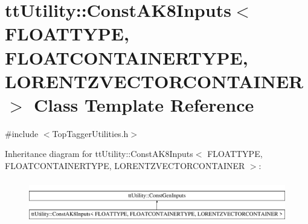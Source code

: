 \hypertarget{classttUtility_1_1ConstAK8Inputs}{\section{tt\-Utility\-:\-:Const\-A\-K8\-Inputs$<$ F\-L\-O\-A\-T\-T\-Y\-P\-E, F\-L\-O\-A\-T\-C\-O\-N\-T\-A\-I\-N\-E\-R\-T\-Y\-P\-E, L\-O\-R\-E\-N\-T\-Z\-V\-E\-C\-T\-O\-R\-C\-O\-N\-T\-A\-I\-N\-E\-R $>$ Class Template Reference}
\label{classttUtility_1_1ConstAK8Inputs}
}


{\ttfamily \#include $<$Top\-Tagger\-Utilities.\-h$>$}

Inheritance diagram for tt\-Utility\-:\-:Const\-A\-K8\-Inputs$<$ F\-L\-O\-A\-T\-T\-Y\-P\-E, F\-L\-O\-A\-T\-C\-O\-N\-T\-A\-I\-N\-E\-R\-T\-Y\-P\-E, L\-O\-R\-E\-N\-T\-Z\-V\-E\-C\-T\-O\-R\-C\-O\-N\-T\-A\-I\-N\-E\-R $>$\-:\begin{figure}[H]
\begin{center}
\leavevmode
\includegraphics[height=1.891892cm]{classttUtility_1_1ConstAK8Inputs}
\end{center}
\end{figure}
